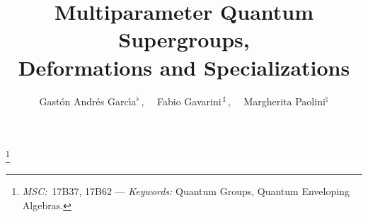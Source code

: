 \documentclass[12pt,reqno,twoside,a4paper]{amsart}
\numberwithin{equation}{section}
\theoremstyle{definition}
\newtheorem{free text}[lema]{}
\theoremstyle{remark}
\theoremstyle{plain}
\begin{document}
\title[MULTIPARAMETER QUANTUM SUPERGROUPS, DEFORMATIONS, SPECIALIZATIONS]
 {Multiparameter Quantum Supergroups,  \\
  Deformations and Specializations}


\author[Gast{\'o}n Andr{\'e}s GARC{\'I}A \ , \ \  Fabio GAVARINI \ , \ \  Margherita PAOLINI]
{Gast{\'o}n Andr{\'e}s Garc{\'\i}a${}^\flat\,$,  \ \ Fabio Gavarini$\,{}^\sharp\,$,  \ \ Margherita Paolini${}^\natural$}

\address{
   \newline
 ${}^\flat$  Departamento de Matem\'atica, Facultad de Ciencias Exactas
   \newline
 Universidad Nacional de La Plata   ---   CMaLP-CIC-CONICET
    La Plata, ARGENTINA   ---   {\tt ggarcia@mate.unlp.edu.ar}
   \newline
 \phantom{A}  and
   \newline
 ${}^\flat$  Guangdong-Technion Israel Institute of Technology,
   \newline
 No.\ 241, Daxue Road, Shantou, Guangdong Province, China
%
 \vspace*{0.5cm}
   \newline
 ${}^\sharp$  Dipartimento di Matematica,
   \newline
 Universit\`a degli Studi di Roma ``Tor Vergata''   ---   INdAM\,/\,GNSAGA
   \newline
 Via della ricerca scientifica 1,  \; I\,-00133 Roma, ITALY   ---   {\tt gavarini@mat.uniroma2.it}
%
 \vspace*{0.5cm}
%
   \newline
  ${}^\natural$  Independent researcher   ---   {\tt margherita.paolini.mp@gmail.com} }

\thanks{ \emph{MSC:}\,  17B37, 17B62   ---
\emph{Keywords:} Quantum Groups, Quantum Enveloping Algebras.}

\end{document}
